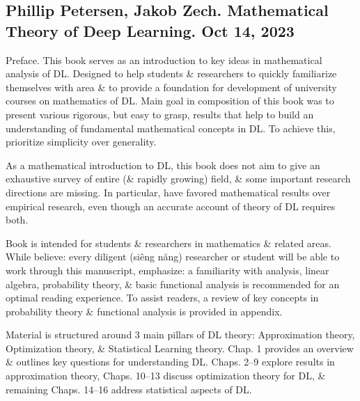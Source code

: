 \documentclass{article}
\begin{document}

\subsection{{\sc Phillip Petersen, Jakob Zech}. Mathematical Theory of Deep Learning. Oct 14, 2023}
{\sf Preface.} This book serves as an introduction to key ideas in mathematical analysis of DL. Designed to help students \& researchers to quickly familiarize themselves with area \& to provide a foundation for development of university courses on mathematics of DL. Main goal in composition of this book was to present various rigorous, but easy to grasp, results that help to build an understanding of fundamental mathematical concepts in DL. To achieve this, prioritize simplicity over generality.

As a mathematical introduction to DL, this book does not aim to give an exhaustive survey of entire (\& rapidly growing) field, \& some important research directions are missing. In particular, have favored mathematical results over empirical research, even though an accurate account of theory of DL requires both.

Book is intended for students \& researchers in mathematics \& related areas. While believe: every diligent (siêng năng) researcher or student will be able to work through this manuscript, emphasize: a familiarity with analysis, linear algebra, probability theory, \& basic functional analysis is recommended for an optimal reading experience. To assist readers, a review of key concepts in probability theory \& functional analysis is provided in appendix.

Material is structured around 3 main pillars of DL theory: Approximation theory, Optimization theory, \& Statistical Learning theory. Chap. 1 provides an overview \& outlines key questions for understanding DL. Chaps. 2--9 explore results in approximation theory, Chaps. 10--13 discuss optimization theory for DL, \& remaining Chaps. 14--16 address statistical aspects of DL.
\end{document}
